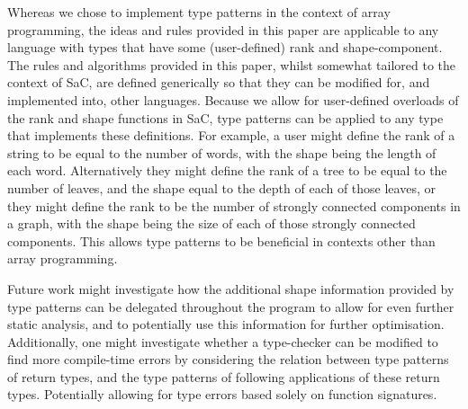 Whereas we chose to implement type patterns in the context of array programming, the ideas and rules provided in this paper are applicable to any language with types that have some (user-defined) rank and shape-component.
The rules and algorithms provided in this paper, whilst somewhat tailored to the context of SaC, are defined generically so that they can be modified for, and implemented into, other languages.
Because we allow for user-defined overloads of the rank and shape functions in SaC, type patterns can be applied to any type that implements these definitions.
For example, a user might define the rank of a string to be equal to the number of words, with the shape being the length of each word.
Alternatively they might define the rank of a tree to be equal to the number of leaves, and the shape equal to the depth of each of those leaves,
or they might define the rank to be the number of strongly connected components in a graph, with the shape being the size of each of those strongly connected components.
This allows type patterns to be beneficial in contexts other than array programming.

Future work might investigate how the additional shape information provided by type patterns can be delegated throughout the program to allow for even further static analysis, and to potentially use this information for further optimisation.
Additionally, one might investigate whether a type-checker can be modified to find more compile-time errors by considering the relation between type patterns of return types, and the type patterns of following applications of these return types.
Potentially allowing for type errors based solely on function signatures.
